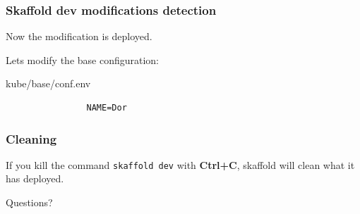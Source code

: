 	\begin{frame}[fragile]
		\frametitle{Skaffold dev modifications detection}
		
		Now the modification is deployed.
		
		Lets modify the base configuration:
		\begin{block}{kube/base/conf.env}
			\begin{verbatim}
				NAME=Dor
			\end{verbatim}
		\end{block}
		
	\end{frame}
	
	\begin{frame}[fragile]
		\frametitle{Cleaning}
		
		If you kill the command \verb!skaffold dev! with \textbf{Ctrl+C}, skaffold will clean what it has deployed.
	\end{frame}
	
	\begin{frame}
		\begin{center}
			Questions?
		\end{center}
	\end{frame}